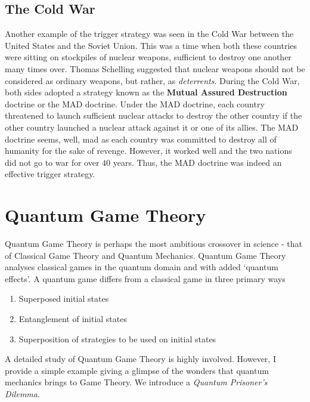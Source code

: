 \documentclass{article}
\theoremstyle{definition}
\begin{document}
\subsection{The Cold War}

Another example of the trigger strategy was seen in the Cold War between the United States and the Soviet Union. This was a time when both these countries were sitting on stockpiles of nuclear weapons, sufficient to destroy one another many times over. Thomas Schelling suggested that nuclear weapons should not be considered as ordinary weapons, but rather, as \textit{deterrents}. During the Cold War, both sides adopted a strategy known as the \textbf{Mutual Assured Destruction} doctrine or the MAD doctrine. Under the MAD doctrine, each country threatened to launch sufficient nuclear attacks to destroy the other country if the other country launched a nuclear attack against it or one of its allies. The MAD doctrine seems, well, mad as each country was committed to destroy all of humanity for the sake of revenge. However, it worked well and the two nations did not go to war for over $40$ years. Thus, the MAD doctrine was indeed an effective trigger strategy.


\section{Quantum Game Theory}

Quantum Game Theory is perhaps the most ambitious crossover in science - that of Classical Game Theory and Quantum Mechanics. Quantum Game Theory analyses classical games in the quantum domain and with added `quantum effects'. A quantum game differs from a classical game in three primary ways 
\begin{enumerate}
    \item Superposed initial states
    \item Entanglement of initial states
    \item Superposition of strategies to be used on initial states
\end{enumerate}
A detailed study of Quantum Game Theory is highly involved. However, I provide a simple example giving a glimpse of the wonders that quantum mechanics brings to Game Theory. We introduce a \textit{Quantum Prisoner's Dilemma}. \medskip
\end{document}
